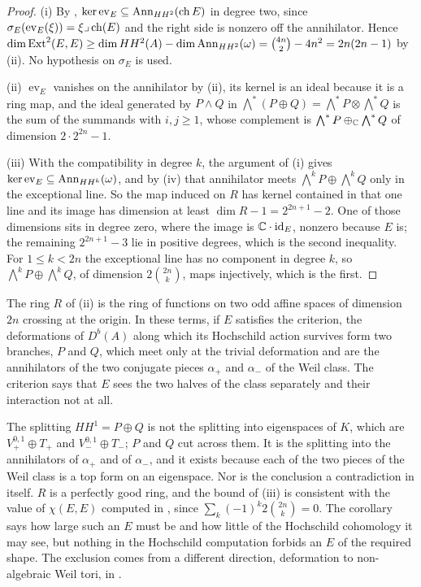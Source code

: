 \begin{proof}
(i) By , $\ker\operatorname{ev}_{E}\subseteq\operatorname{Ann}_{HH^{2}}(\operatorname{ch} E)$
in degree two, since $\sigma_{E}(\operatorname{ev}_{E}(\xi))=\xi\lrcorner\operatorname{ch}(E)$
and the right side is nonzero off the annihilator. Hence
$\dim\operatorname{Ext}^{2}(E,E)\ge\dim HH^{2}(A)-\dim\operatorname{Ann}_{HH^{2}}(\omega)
=\binom{4n}{2}-4n^{2}=2n(2n-1)$ by (ii). No hypothesis
on $\sigma_{E}$ is used.

(ii) $\operatorname{ev}_{E}$ vanishes on the annihilator by
(ii), its kernel is an ideal because it is a ring map, and
the ideal generated by $P\wedge Q$ in $\bigwedge^{*}(P\oplus Q)
=\bigwedge^{*}P\otimes\bigwedge^{*}Q$ is the sum of the summands with
$i,j\ge1$, whose complement is $\bigwedge^{*}P\oplus_{\mathbb{C}}\bigwedge^{*}Q$ of
dimension $2\cdot2^{2n}-1$.

(iii) With the compatibility in degree $k$, the argument of (i) gives
$\ker\operatorname{ev}_{E}\subseteq\operatorname{Ann}_{HH^{k}}(\omega)$, and by
(iv) that annihilator meets $\bigwedge^{k}P\oplus
\bigwedge^{k}Q$ only in the exceptional line. So the map induced on $R$ has
kernel contained in that one line and its image has dimension at least
$\dim R-1=2^{2n+1}-2$. One of those dimensions sits in degree zero, where the
image is $\mathbb{C}\cdot\operatorname{id}_{E}$, nonzero because $E$ is; the remaining
$2^{2n+1}-3$ lie in positive degrees, which is the second inequality. For
$1\le k<2n$ the exceptional line has no component in degree $k$, so
$\bigwedge^{k}P\oplus\bigwedge^{k}Q$, of dimension $2\binom{2n}{k}$, maps
injectively, which is the first.
\end{proof}

\begin{remark}\label{rem:twobranches}
The ring $R$ of (ii) is the ring of functions on two odd
affine spaces of dimension $2n$ crossing at the origin. In these terms, if $E$
satisfies the criterion, the deformations of $D^{b}(A)$ along which its
Hochschild action survives form two branches, $P$ and $Q$, which meet only at
the trivial deformation and are the annihilators of the two conjugate pieces
$\alpha_{+}$ and $\alpha_{-}$ of the Weil class. The criterion says that $E$
sees the two halves of the class separately and their interaction not at all.

The splitting $HH^{1}=P\oplus Q$ is not the splitting into eigenspaces of
$K$, which are $V_{+}^{0,1}\oplus T_{+}$ and $V_{-}^{0,1}\oplus T_{-}$; $P$
and $Q$ cut across them. It is the splitting into the annihilators of
$\alpha_{+}$ and of $\alpha_{-}$, and it exists because each of the two
pieces of the Weil class is a top form on an eigenspace. Nor is the
conclusion a contradiction in itself. $R$ is a perfectly good ring, and the
bound of (iii) is consistent with the value of $\chi(E,E)$ computed in
, since $\sum_{k}(-1)^{k}2\binom{2n}{k}=0$. The
corollary says how large such an $E$ must be and how little of the Hochschild
cohomology it may see, but nothing in the Hochschild computation forbids an
$E$ of the required shape. The exclusion comes from a different direction,
deformation to non-algebraic Weil tori, in .
\end{remark}

